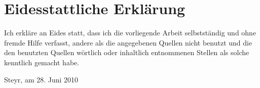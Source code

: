 \section*{Eidesstattliche Erklärung} %
\label{sec:eidessterkl}

Ich erkläre an Eides statt, dass ich die vorliegende Arbeit selbstständig und ohne fremde Hilfe verfasst, andere als die angegebenen Quellen nicht benutzt und die den benutzten Quellen wörtlich oder inhaltlich entnommenen Stellen als solche kenntlich gemacht habe.

\vspace*{2cm}

\begin{flushright}
 Steyr, am 28. Juni 2010
\end{flushright}
